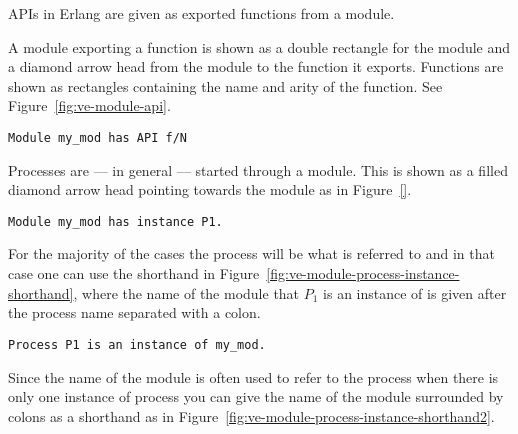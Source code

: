 \documentclass[a4paper, pdftex]{tufte-handout}
\begin{document}
APIs in Erlang are given as exported functions from a module.

A module exporting a function is shown as a double rectangle for the module and a
diamond arrow head from the module to the function it exports. Functions are shown as
rectangles containing the name and arity of the function. See
Figure~\ref{fig:ve-module-api}.

\begin{marginfigure}
  \centering
  \caption{\texttt{Module my\_mod has API f/N}}
  \label{fig:ve-module-api}
\end{marginfigure}

Processes are --- in general --- started through a module. This is shown as a filled
diamond arrow head pointing towards the module as in Figure~\ref{}.

\begin{marginfigure}
  \centering
  \caption{\texttt{Module my\_mod has instance P1.}}
  \label{fig:ve-module-process-instance}
\end{marginfigure}

For the majority of the cases the process will be what is referred to and in that
case one can use the shorthand in
Figure~\ref{fig:ve-module-process-instance-shorthand}, where the name of the module
that $P_1$ is an instance of is given after the process name separated with a colon. 

\begin{marginfigure}
  \centering
  \caption{\texttt{Process P1 is an instance of  my\_mod.}}
  \label{fig:ve-module-process-instance-shorthand}
\end{marginfigure}

\newpage

Since the name of the module is often used to refer to the process when there is only
one instance of process you can give the name of the module surrounded by colons as a
shorthand as in Figure~\ref{fig:ve-module-process-instance-shorthand2}.
\end{document}
